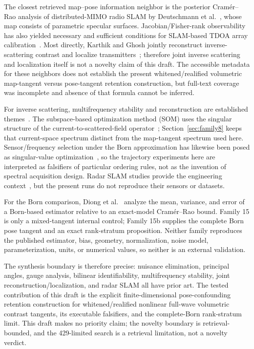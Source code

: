 \documentclass[12pt]{article}
\begin{document}
The closest retrieved map--pose information neighbor is the posterior
Cram\'er--Rao analysis of distributed-MIMO radio SLAM by Deutschmann et
al.~\cite{deutschmann}, whose map consists of parametric specular surfaces.
Jacobian/Fisher-rank observability has also yielded necessary and sufficient
conditions for SLAM-based TDOA array calibration~\cite{su}. Most directly,
Karthik and Ghosh jointly reconstruct inverse-scattering contrast and localize
transmitters~\cite{karthik}; therefore joint inverse scattering and localization
itself is not a novelty claim of this draft. The accessible metadata for these
neighbors does not establish the present whitened/realified volumetric
map-tangent versus pose-tangent retention construction, but full-text coverage
was incomplete and absence of that formula cannot be inferred.

For inverse scattering, multifrequency stability and reconstruction are
established themes~\cite{entekhabi,shea,weidling}. The subspace-based
optimization method (SOM) uses the singular structure of the
current-to-scattered-field operator~\cite{chen}; Section~\ref{sec:family8}
keeps that current-space spectrum distinct from the map-tangent spectrum used
here. Sensor/frequency selection under the Born approximation has likewise
been posed as singular-value optimization~\cite{capozzoli}, so the trajectory
experiments here are interpreted as falsifiers of particular ordering rules,
not as the invention of spectral acquisition design. Radar SLAM studies
provide the engineering context~\cite{burnett,hilger}, but the present runs do
not reproduce their sensors or datasets.

For the Born comparison, Diong et al.~\cite{diong} analyze the mean, variance,
and error of a Born-based estimator relative to an exact-model Cram\'er--Rao
bound. Family 15 is only a mixed-tangent internal control; Family 15b supplies
the complete Born pose tangent and an exact rank-stratum proposition. Neither
family reproduces the published estimator, bias, geometry, normalization,
noise model, parameterization, units, or numerical values, so neither is an
external validation.

The synthesis boundary is therefore precise: nuisance elimination, principal
angles, gauge analysis, bilinear identifiability, multifrequency stability,
joint reconstruction/localization, and radar SLAM all have prior art. The
tested contribution of this draft is the explicit finite-dimensional
pose-confounding retention construction for whitened/realified nonlinear
full-wave volumetric contrast tangents, its executable falsifiers, and the
complete-Born rank-stratum limit. This draft makes no priority claim; the
novelty boundary is retrieval-bounded, and the 429-limited search is a
retrieval limitation, not a novelty verdict.
\end{document}

